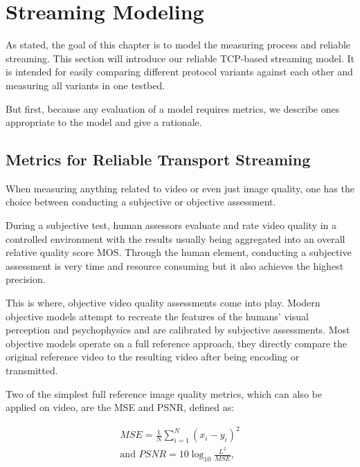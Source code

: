 \section{Streaming Modeling}
\label{c3:sec:modeling}

As stated, the goal of this chapter is to model the measuring process and reliable streaming. This section will introduce our reliable \gls{TCP}-based streaming model. It is intended for easily comparing different protocol variants against each other and measuring all variants in one testbed. 

But first, because any evaluation of a model requires metrics, we describe ones appropriate to the model and give a rationale.
 
\subsection{Metrics for Reliable Transport Streaming}
\label{c3:sec:metrics}

When measuring anything related to video or even just image quality, one has the choice between conducting a subjective or objective assessment. 

During a subjective test, human assessors evaluate and rate video quality in a controlled environment with the results usually being aggregated into an overall relative quality score \gls{MOS}. Through the human element, conducting a subjective assessment is very time and resource consuming but it also achieves the highest precision.

This is where, objective video quality assessments come into play. Modern objective models attempt to recreate the features of the humans' visual perception and psychophysics and are calibrated by subjective assessments. Most objective models operate on a full reference approach, they directly compare the original reference video to the resulting video after being encoding or transmitted.

Two of the simplest full reference image quality metrics, which can also be applied on video, are the \gls{MSE} and \gls{PSNR}, defined as:

\begin{equation}
    \begin{aligned}
    MSE = \frac{1}{N} \sum_{i=1}^{N}(x_i - y_i)^2\\
    \text{and } PSNR = 10 \log_{10} \frac{L^2}{MSE},
    \end{aligned}
\end{equation}

